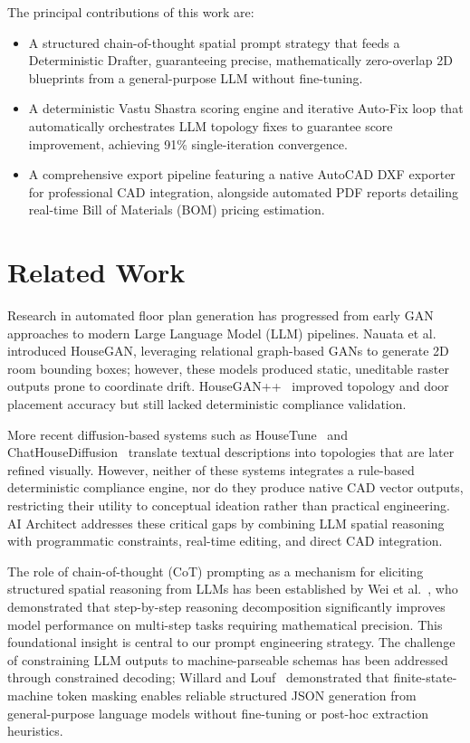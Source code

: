 \documentclass[10pt, twocolumn, letterpaper]{article}
\begin{document}
The principal contributions of this work are:
\begin{itemize}[leftmargin=*, itemsep=0pt, topsep=2pt]
  \item A structured chain-of-thought spatial prompt strategy that feeds a Deterministic Drafter, guaranteeing precise, mathematically zero-overlap 2D blueprints from a general-purpose LLM without fine-tuning.
  \item A deterministic Vastu Shastra scoring engine and iterative Auto-Fix loop that automatically orchestrates LLM topology fixes to guarantee score improvement, achieving 91\% single-iteration convergence.
  \item A comprehensive export pipeline featuring a native AutoCAD DXF exporter for professional CAD integration, alongside automated PDF reports detailing real-time Bill of Materials (BOM) pricing estimation.
\end{itemize}

\section{Related Work}

Research in automated floor plan generation has progressed from early GAN approaches to modern Large Language Model (LLM) pipelines. Nauata et al.~\cite{houseGAN} introduced HouseGAN, leveraging relational graph-based GANs to generate 2D room bounding boxes; however, these models produced static, uneditable raster outputs prone to coordinate drift. HouseGAN++~\cite{houseGANpp} improved topology and door placement accuracy but still lacked deterministic compliance validation.

More recent diffusion-based systems such as HouseTune~\cite{housetune} and ChatHouseDiffusion~\cite{chathousediffusion} translate textual descriptions into topologies that are later refined visually. However, neither of these systems integrates a rule-based deterministic compliance engine, nor do they produce native CAD vector outputs, restricting their utility to conceptual ideation rather than practical engineering. AI Architect addresses these critical gaps by combining LLM spatial reasoning with programmatic constraints, real-time editing, and direct CAD integration.

The role of chain-of-thought (CoT) prompting as a mechanism for eliciting
structured spatial reasoning from LLMs has been established by Wei et
al.~\cite{cot_prompting}, who demonstrated that step-by-step reasoning
decomposition significantly improves model performance on multi-step tasks
requiring mathematical precision. This foundational insight is central to
our prompt engineering strategy. The challenge of constraining LLM outputs
to machine-parseable schemas has been addressed through constrained decoding;
Willard and Louf~\cite{efficient_guided_gen} demonstrated that finite-state-machine
token masking enables reliable structured JSON generation from general-purpose
language models without fine-tuning or post-hoc extraction heuristics.
\end{document}
